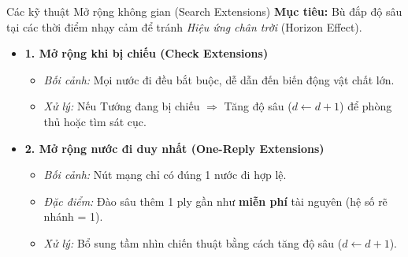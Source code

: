 \begin{frame}{Các kỹ thuật Mở rộng không gian (Search Extensions)}
    \textbf{Mục tiêu:} Bù đắp độ sâu tại các thời điểm nhạy cảm để tránh \textit{Hiệu ứng chân trời} (Horizon Effect).
    
    \begin{itemize}
        \item<2-> \textbf{1. Mở rộng khi bị chiếu (Check Extensions)}
        \begin{itemize}
            \item \textit{Bối cảnh:} Mọi nước đi đều bắt buộc, dễ dẫn đến biến động vật chất lớn.
            \item \textit{Xử lý:} Nếu Tướng đang bị chiếu $\Rightarrow$ Tăng độ sâu ($d \leftarrow d + 1$) để phòng thủ hoặc tìm sát cục.
        \end{itemize}
        
        \item<3-> \textbf{2. Mở rộng nước đi duy nhất (One-Reply Extensions)}
        \begin{itemize}
            \item \textit{Bối cảnh:} Nút mạng chỉ có đúng 1 nước đi hợp lệ.
            \item \textit{Đặc điểm:} Đào sâu thêm 1 ply gần như \textbf{miễn phí} tài nguyên (hệ số rẽ nhánh = 1).
            \item \textit{Xử lý:} Bổ sung tầm nhìn chiến thuật bằng cách tăng độ sâu ($d \leftarrow d + 1$).
        \end{itemize}
    \end{itemize}
\end{frame}

